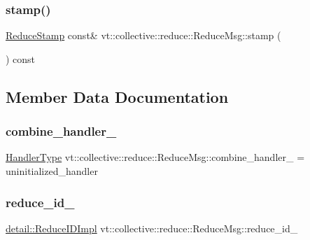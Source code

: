 \subsubsection{\texorpdfstring{stamp()}{stamp()}}
{\footnotesize\ttfamily \hyperlink{namespacevt_1_1collective_1_1reduce_a7b7cb3021ac5654d92825d9fab0250b2}{Reduce\+Stamp} const\& vt\+::collective\+::reduce\+::\+Reduce\+Msg\+::stamp (\begin{DoxyParamCaption}{ }\end{DoxyParamCaption}) const\hspace{0.3cm}{\ttfamily [inline]}}



\subsection{Member Data Documentation}
\mbox{\label{structvt_1_1collective_1_1reduce_1_1_reduce_msg_a1265faa9b668a8668148a97f98b75d0d}} 
\subsubsection{\texorpdfstring{combine\+\_\+handler\+\_\+}{combine\_handler\_}}
{\footnotesize\ttfamily \hyperlink{namespacevt_af64846b57dfcaf104da3ef6967917573}{Handler\+Type} vt\+::collective\+::reduce\+::\+Reduce\+Msg\+::combine\+\_\+handler\+\_\+ = uninitialized\+\_\+handler}

\mbox{\label{structvt_1_1collective_1_1reduce_1_1_reduce_msg_a257abf9404c2c0cfa00625261b222540}} 
\subsubsection{\texorpdfstring{reduce\+\_\+id\+\_\+}{reduce\_id\_}}
{\footnotesize\ttfamily \hyperlink{structvt_1_1collective_1_1reduce_1_1detail_1_1_reduce_i_d_impl}{detail\+::\+Reduce\+I\+D\+Impl} vt\+::collective\+::reduce\+::\+Reduce\+Msg\+::reduce\+\_\+id\+\_\+}

